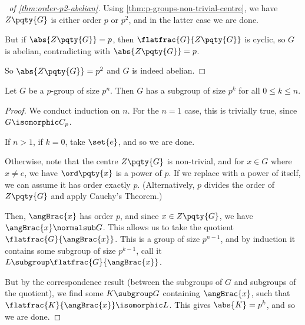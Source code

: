 \begin{proof}[\proofname\ of \autoref{thm:order-p2-abelian}]
    Using \autoref{thm:p-groups-non-trivial-centre}, we have \(Z\pqty{G}\) is either order \(p\) or \(p^2\), and in the latter case we are done.

    But if \(\abs{Z\pqty{G}} = p\), then \(\flatfrac{G}{Z\pqty{G}}\) is cyclic, so \(G\) is abelian, contradicting with \(\abs{Z\pqty{G}} = p\).
    
    So \(\abs{Z\pqty{G}} = p^2\) and \(G\) is indeed abelian.
\end{proof}

\begin{theorem}
    \label{thm:p-group-subgoup-order-power-of-p}
    Let \(G\) be a \(p\)-group of size \(p^n\). Then \(G\) has a subgroup of size \(p^{k}\) for all \(0 \leq k \leq n\).
\end{theorem}

\begin{proof}
    We conduct induction on \(n\). For the \(n = 1\) case, this is trivially true, since \(G \isomorphic C_p\).

    If \(n > 1\), if \(k = 0\), take \(\set{e}\), and so we are done.

    Otherwise, note that the centre \(Z\pqty{G}\) is non-trivial, and for \(x \in G\) where \(x \neq e\), we have \(\ord\pqty{x}\) is a power of \(p\). If we replace with a power of itself, we can assume it has order exactly \(p\). (Alternatively, \(p\) divides the order of \(Z\pqty{G}\) and apply Cauchy's Theorem.)

    Then, \(\angBrac{x}\) has order \(p\), and since \(x \in Z\pqty{G}\), we have \(\angBrac{x} \normalsub G\). This allows us to take the quotient \(\flatfrac{G}{\angBrac{x}}\). This is a group of size \(p^{n - 1}\), and by induction it contains some subgroup of size \(p^{k - 1}\), call it \(L \subgroup \flatfrac{G}{\angBrac{x}}\).

    But by the correspondence result (between the subgroups of \(G\) and subgroups of the quotient), we find some \(K \subgroup G\) containing \(\angBrac{x}\), such that \(\flatfrac{K}{\angBrac{x}} \isomorphic L\). This gives \(\abs{K} = p^k\), and so we are done.
\end{proof}